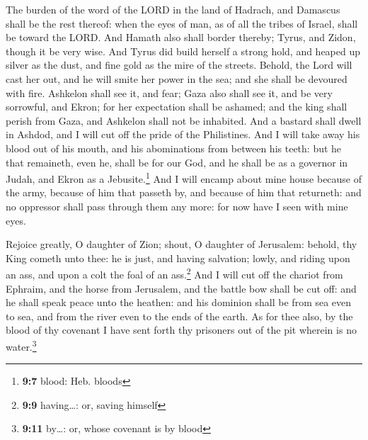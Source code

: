  The burden of the word of the LORD in the land of
Hadrach, and Damascus shall be the rest thereof: when the eyes of man,
as of all the tribes of Israel, shall be toward the LORD. 
And Hamath also shall border thereby; Tyrus, and Zidon, though it be
very wise.  And Tyrus did build herself a strong hold, and
heaped up silver as the dust, and fine gold as the mire of the streets.
 Behold, the Lord will cast her out, and he will smite her
power in the sea; and she shall be devoured with fire. 
Ashkelon shall see it, and fear; Gaza also shall see it, and be very
sorrowful, and Ekron; for her expectation shall be ashamed; and the king
shall perish from Gaza, and Ashkelon shall not be inhabited.
 And a bastard shall dwell in Ashdod, and I will cut off
the pride of the Philistines.  And I will take away his
blood out of his mouth, and his abominations from between his teeth: but
he that remaineth, even he, shall be for our God, and he shall be as a
governor in Judah, and Ekron as a Jebusite.\footnote{\textbf{9:7} blood:
  Heb. bloods}  And I will encamp about mine house because
of the army, because of him that passeth by, and because of him that
returneth: and no oppressor shall pass through them any more: for now
have I seen with mine eyes.

 Rejoice greatly, O daughter of Zion; shout, O daughter of
Jerusalem: behold, thy King cometh unto thee: he is just, and having
salvation; lowly, and riding upon an ass, and upon a colt the foal of an
ass.\footnote{\textbf{9:9} having\ldots: or, saving himself}
 And I will cut off the chariot from Ephraim, and the
horse from Jerusalem, and the battle bow shall be cut off: and he shall
speak peace unto the heathen: and his dominion shall be from sea even to
sea, and from the river even to the ends of the earth. 
As for thee also, by the blood of thy covenant I have sent forth thy
prisoners out of the pit wherein is no water.\footnote{\textbf{9:11}
  by\ldots: or, whose covenant is by blood}

